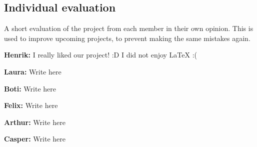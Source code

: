 \documentclass[../report.tex]{subfiles}
\begin{document}
\subsection{Individual evaluation}
A short evaluation of the project from each member in their own opinion. This is used to improve
upcoming projects, to prevent making the same mistakes again.

\textbf{Henrik:}
I really liked our project! :D I did not enjoy LaTeX :(

\textbf{Laura:}
Write here

\textbf{Boti:}
Write here

\textbf{Felix:}
Write here

\textbf{Arthur:}
Write here

\textbf{Casper:}
Write here
\end{document}
